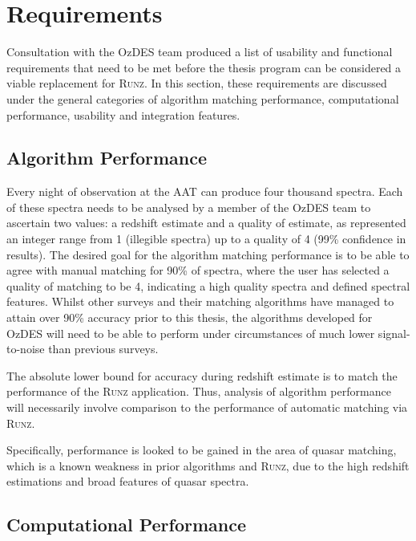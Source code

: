\documentclass[titlesmallcaps, examinerscopy, copyrightpage]{uqthesis}
\begin{document}

\chapter{Requirements}
\label{ch:req}

Consultation with the OzDES team produced a list of usability and functional requirements that need to be met before the thesis program can be considered a viable replacement for \textsc{Runz}. In this section, these requirements are discussed under the general categories of algorithm matching performance, computational performance, usability and integration features.
\section{Algorithm Performance}

Every night of observation at the AAT can produce four thousand spectra. Each of these spectra needs to be analysed by a member of the OzDES team to ascertain two values: a redshift estimate and a quality of estimate, as represented an integer range from 1 (illegible spectra) up to a quality of 4 (99\% confidence in results). The desired goal for the algorithm matching performance is to be able to agree with manual matching for 90\% of spectra, where the user has selected a quality of matching to be 4, indicating a high quality spectra and defined spectral features. Whilst other surveys and their matching algorithms have managed to attain over 90\% accuracy prior to this thesis, the algorithms developed for OzDES will need to be able to perform under circumstances of much lower signal-to-noise than previous surveys.

The absolute lower bound for accuracy during redshift estimate is to match the performance of the \textsc{Runz} application. Thus, analysis of algorithm performance will necessarily involve comparison to the performance of automatic matching via \textsc{Runz}.

Specifically, performance is looked to be gained in the area of quasar matching, which is a known weakness in prior algorithms and \textsc{Runz}, due to the high redshift estimations and broad features of quasar spectra.

\section{Computational Performance}
\end{document}
